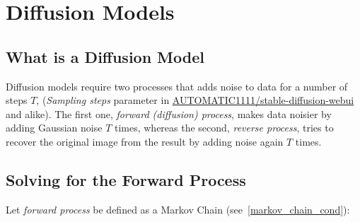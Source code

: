 \documentclass{article}
\numberwithin{equation}{subsection}
\begin{document}
\section{Diffusion Models}
\subsection{What is a Diffusion Model}

Diffusion models require two processes that adds noise to data for a number of steps $T$, (\textit{Sampling steps} parameter in \href{https://github.com/AUTOMATIC1111/stable-diffusion-webui}{AUTOMATIC1111/stable-diffusion-webui} and alike). The first one, \textit{forward (diffusion) process}, makes data noisier by adding Gaussian noise $T$ times, whereas the second, \textit{reverse process}, tries to recover the original image from the result by adding noise again $T$ times. 
\subsection{Solving for the Forward Process}
Let \textit{forward process} be defined as a Markov Chain (see~\ref{markov_chain_cond}):
\end{document}
